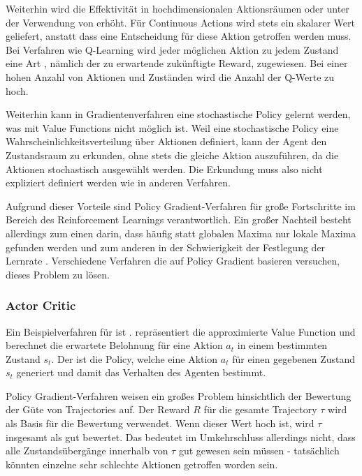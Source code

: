 Weiterhin wird die Effektivität in hochdimensionalen Aktionsräumen oder unter der Verwendung von  erhöht. Für Continuous Actions wird stets ein skalarer Wert geliefert, anstatt dass eine Entscheidung für diese Aktion getroffen werden muss. Bei Verfahren wie Q-Learning wird jeder möglichen Aktion zu jedem Zustand eine Art , nämlich der zu erwartende zukünftigte Reward, zugewiesen. Bei einer hohen Anzahl von Aktionen und Zuständen wird die Anzahl der Q-Werte zu hoch.

Weiterhin kann in Gradientenverfahren eine stochastische Policy gelernt werden, was mit Value Functions nicht möglich ist. Weil eine stochastische Policy eine Wahrscheinlichkeitsverteilung über Aktionen definiert, kann der Agent den Zustandsraum zu erkunden, ohne stets die gleiche Aktion auszuführen, da die Aktionen stochastisch ausgewählt werden. Die Erkundung muss also nicht expliziert definiert werden wie in anderen Verfahren.

Aufgrund dieser Vorteile sind Policy Gradient-Verfahren für große Fortschritte im Bereich des Reinforcement Learnings verantwortlich. Ein großer Nachteil besteht allerdings zum einen darin, dass häufig statt globalen Maxima nur lokale Maxima gefunden werden und zum anderen in der Schwierigkeit der Festlegung der Lernrate \cite{openai_ppo_blog}. Verschiedene Verfahren die auf Policy Gradient basieren versuchen, dieses Problem zu lösen.



\subsubsection{Actor Critic}\label{actor_critic}
Ein Beispielverfahren für  ist  \cite{reinforcement_introduction_book} \cite{actor_critic_blog}.  repräsentiert die approximierte Value Function und berechnet die erwartete Belohnung für eine Aktion $a_t$ in einem bestimmten Zustand $s_t$. Der  ist die Policy, welche eine Aktion $a_t$ für einen gegebenen Zustand $s_t$ generiert und damit das Verhalten des Agenten bestimmt.

Policy Gradient-Verfahren weisen ein großes Problem hinsichtlich der Bewertung der Güte von Trajectories auf. Der Reward $R$ für die gesamte Trajectory $\tau$ wird als Basis für die Bewertung verwendet. Wenn dieser Wert hoch ist, wird $\tau$ insgesamt als gut bewertet. Das bedeutet im Umkehrschluss allerdings nicht, dass alle Zustandsübergänge innerhalb von $\tau$ gut gewesen sein müssen - tatsächlich könnten einzelne sehr schlechte Aktionen getroffen worden sein.

